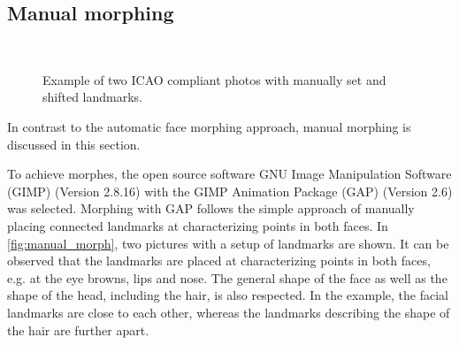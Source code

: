 \subsection{Manual morphing}
\label{manual_morph}
\begin{figure}[h]
	\centering
	\label{subfig:manualmorph01}\hspace{10pt}
	\label{subfig:manualmorph02}\\
	\caption{Example of two ICAO compliant photos with manually set and shifted landmarks.}
	\label{fig:manual_morph} 
\end{figure}
In contrast to the automatic face morphing approach, manual morphing is discussed in this section. 

To achieve morphes, the open source software GNU Image Manipulation Software (GIMP) (Version 2.8.16) with the GIMP Animation Package (GAP) (Version 2.6) was selected. Morphing with GAP follows the simple approach of manually placing connected landmarks at characterizing points in both faces. In \autoref{fig:manual_morph}, two pictures with a setup of landmarks are shown. It can be observed that the landmarks are placed at characterizing points in both faces, e.g. at the eye browns, lips and nose. The general shape of the face as well as the shape of the head, including the hair, is also respected. In the example, the facial landmarks are close to each other, whereas the landmarks describing the shape of the hair are further apart. 

